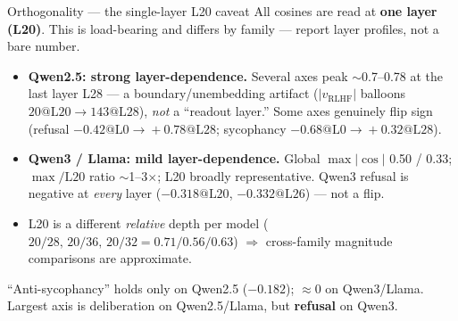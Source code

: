\documentclass[aspectratio=169,11pt]{beamer}
\begin{document}
\begin{frame}{Orthogonality --- the single-layer L20 caveat}
  All cosines are read at \textbf{one layer (L20)}. This is load-bearing and
  differs by family --- report layer profiles, not a bare number.

  \vspace{0.6em}
  \begin{itemize}
    \item \textbf{Qwen2.5: strong layer-dependence.} Several axes peak $\sim$0.7--0.78
      at the last layer L28 --- a boundary/unembedding artifact ($|v_{\mathrm{RLHF}}|$
      balloons $20@\text{L20}\!\to\!143@\text{L28}$), \emph{not} a ``readout layer.''
      Some axes genuinely flip sign (refusal $-0.42@\text{L0}\!\to\!+0.78@\text{L28}$;
      sycophancy $-0.68@\text{L0}\!\to\!+0.32@\text{L28}$).
    \item \textbf{Qwen3 / Llama: mild layer-dependence.} Global $\max|\cos|$ 0.50 / 0.33;
      $\max/\text{L20}$ ratio $\sim$1--3$\times$; L20 broadly representative. Qwen3
      refusal is negative at \emph{every} layer ($-0.318@\text{L20}$, $-0.332@\text{L26}$)
      --- not a flip.
    \item L20 is a different \emph{relative} depth per model ($20/28,\,20/36,\,20/32 =
      0.71/0.56/0.63$) $\Rightarrow$ cross-family magnitude comparisons are approximate.
  \end{itemize}

  \vspace{0.4em}
  \footnotesize
  ``Anti-sycophancy'' holds only on Qwen2.5 ($-0.182$); $\approx 0$ on Qwen3/Llama.
  Largest axis is deliberation on Qwen2.5/Llama, but \textbf{refusal} on Qwen3.
\end{frame}
\end{document}
